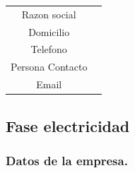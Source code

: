 \documentclass[../main]{subfiles}
\newcounter{z}
\begin{document}
{\begin{table}[h!]
    \centering
    \begin{tabular}{|c|c|} \hline
        Razon social &  \\
        Domicilio & \\
        Telefono & \\
        Persona Contacto & \\
        Email & \\
        
    \end{tabular}
\end{table}

\subsection{Fase electricidad}
\subsubsection{Datos de la empresa.}
}
\end{document}

